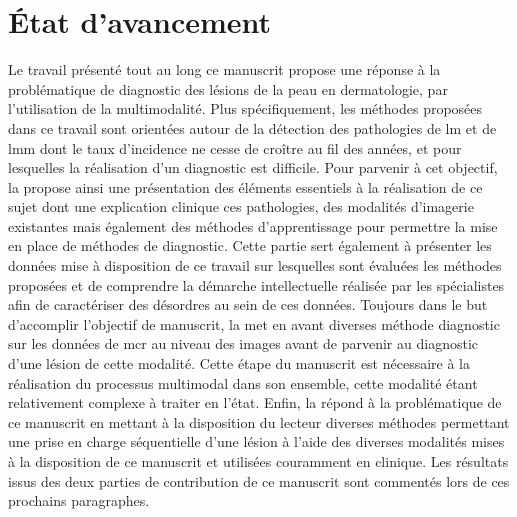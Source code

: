 \renewcommand{\thechapter}{\roman{chapter}}
\setcounter{chapter}{5}
\setcounter{figure}{0}

\label{chap:conclusion}

\section*{État d'avancement}
Le travail présenté tout au long ce manuscrit propose une réponse à la problématique de diagnostic des lésions de la peau en dermatologie, par l'utilisation de la multimodalité. Plus spécifiquement, les méthodes proposées dans ce travail sont orientées autour de la détection des pathologies de \gls{lm} et de \gls{lmm} dont le taux d'incidence ne cesse de croître au fil des années, et pour lesquelles la réalisation d'un diagnostic est difficile. Pour parvenir à cet objectif, la  propose ainsi une présentation des éléments essentiels à la réalisation de ce sujet dont une explication clinique ces pathologies, des modalités d'imagerie existantes mais également des méthodes d'apprentissage pour permettre la mise en place de méthodes de diagnostic. Cette partie sert également à présenter les données mise à disposition de ce travail sur lesquelles sont évaluées les méthodes proposées et de comprendre la démarche intellectuelle réalisée par les spécialistes afin de caractériser des désordres au sein de ces données. Toujours dans le but d'accomplir l'objectif de manuscrit, la  met en avant diverses méthode diagnostic sur les données de \gls{mcr} au niveau des images avant de parvenir au diagnostic d'une lésion de cette modalité. Cette étape du manuscrit est nécessaire à la réalisation du processus multimodal dans son ensemble, cette modalité étant relativement complexe à traiter en l'état. Enfin, la  répond à la problématique de ce manuscrit en mettant à la disposition du lecteur diverses méthodes permettant une prise en charge séquentielle d'une lésion à l'aide des diverses modalités mises à la disposition de ce manuscrit et utilisées couramment en clinique. Les résultats issus des deux parties de contribution de ce manuscrit sont commentés lors de ces prochains paragraphes.\par

